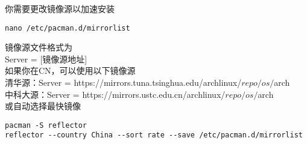 \documentclass{article}
\newenvironment{singlecolumn}{%
	\par
	\noindent
	\begin{minipage}[t]{\textwidth} %
		\setlength{\parfillskip}{0pt plus 1fil} %
	}{%
	\end{minipage}
	\par
}
\begin{document}
\begin{singlecolumn}
你需要更改镜像源以加速安装\\
\begin{tcolorbox}[
	title=bash,
	boxrule=1pt,
	fonttitle=\bfseries,
	listing only, 
	listing options={language=bash}
	]
	\verb|nano /etc/pacman.d/mirrorlist|\\
\end{tcolorbox}
镜像源文件格式为\\
\textcolor{code}{Server = [镜像源地址]}\\
如果你在CN，可以使用以下镜像源\\
清华源：\textcolor{code}{Server = https://mirrors.tuna.tsinghua.edu/archlinux/$repo/os/$arch}\\
中科大源：\textcolor{code}{Server = https://mirrors.ustc.edu.cn/archlinux/$repo/os/$arch}\\
或自动选择最快镜像\\
\begin{tcolorbox}[
	title=bash,
	boxrule=1pt,
	fonttitle=\bfseries,
	listing only, 
	listing options={language=bash}
	]
	\verb|pacman -S reflector|\\
	\verb|reflector --country China --sort rate --save /etc/pacman.d/mirrorlist|\\
\end{tcolorbox}

\medskip

\end{singlecolumn}
\pagebreak
\end{document}
